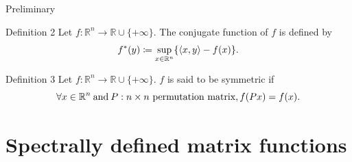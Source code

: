 \documentclass[aspectratio=169, dvipdfmx, 11pt]{beamer}
\newcommand{\RealNumberSet}{\mathbb{R}}
\newcommand{\NDemenstionalRealEuclideanSpace}{\mathbb{R}^n}
\newcommand{\InnerProduct}[2]{\left\langle {#1},{#2}\right\rangle} %
\newcommand{\ExtendedRealValuedFunction}[2]{{#1}: {#2} \to \RealNumberSet \cup \{+\infty\}}
\newcommand{\ConjugateFunction}[1]{{#1}^*}
\begin{document}
\begin{frame}{Preliminary}
  \begin{block}{Definition 2}
    Let $\ExtendedRealValuedFunction{f}{\NDemenstionalRealEuclideanSpace}$.
    The conjugate function of $f$ is defined by
    \begin{equation}
      \ConjugateFunction{f}(y) \coloneqq \sup_{x \in \NDemenstionalRealEuclideanSpace} \{ \InnerProduct{x}{y} - f(x) \}. \notag
    \end{equation}
  \end{block}

  \begin{block}{Definition 3}
    Let $\ExtendedRealValuedFunction{f}{\NDemenstionalRealEuclideanSpace}$.
    $f$ is said to be symmetric if
    \begin{equation}
      \forall x \in \NDemenstionalRealEuclideanSpace \:\text{and}\: P: n \times n \text{ permutation matrix}, f(Px) = f(x). \notag
    \end{equation}
  \end{block}
\end{frame}

\section{Spectrally defined matrix functions}
\end{document}
